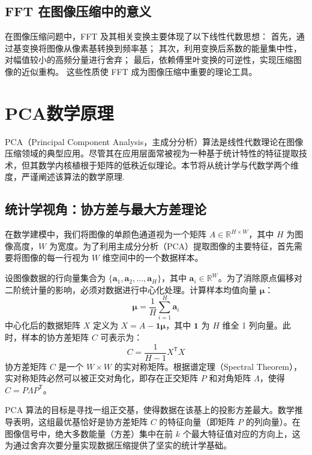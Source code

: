 \documentclass[12pt,a4paper]{article}
\begin{document}
\subsection{FFT 在图像压缩中的意义}

在图像压缩问题中，FFT 及其相关变换主要体现了以下线性代数思想：
首先，通过基变换将图像从像素基转换到频率基；
其次，利用变换后系数的能量集中性，对幅值较小的高频分量进行舍弃；
最后，依赖傅里叶变换的可逆性，实现压缩图像的近似重构。
这些性质使 FFT 成为图像压缩中重要的理论工具。

\section{PCA数学原理}
PCA（Principal Component Analysis，主成分分析）算法是线性代数理论在图像压缩领域的典型应用。尽管其在应用层面常被视为一种基于统计特性的特征提取技术，但其数学内核植根于矩阵的低秩近似理论。本节将从统计学与代数学两个维度，严谨阐述该算法的数学原理.

\subsection{统计学视角：协方差与最大方差理论}
在数学建模中，我们将图像的单颜色通道视为一个矩阵 $A \in \mathbb{R}^{H \times W}$，其中 $H$ 为图像高度，$W$ 为宽度。为了利用主成分分析（PCA）提取图像的主要特征，首先需要将图像的每一行视为 $W$ 维空间中的一个数据样本。

设图像数据的行向量集合为 $\{\mathbf{a}_1, \mathbf{a}_2, \dots, \mathbf{a}_H\}$，其中 $\mathbf{a}_i \in \mathbb{R}^W$。为了消除原点偏移对二阶统计量的影响，必须对数据进行中心化处理。计算样本均值向量 $\mathbf{\mu}$：
\begin{equation}
    \mathbf{\mu} = \frac{1}{H}\sum_{i=1}^H \mathbf{a}_i
\end{equation}
中心化后的数据矩阵 $X$ 定义为 $X = A - \mathbf{1}\mathbf{\mu}$，其中 $\mathbf{1}$ 为 $H$ 维全 1 列向量。此时，样本的协方差矩阵 $C$ 可表示为：
\begin{equation}
    C = \frac{1}{H-1} X^\mathsf{T} X
\end{equation}
协方差矩阵 $C$ 是一个 $W \times W$ 的实对称矩阵。根据谱定理（Spectral Theorem），实对称矩阵必然可以被正交对角化，即存在正交矩阵 $P$ 和对角矩阵 $\Lambda$，使得 $C = P \Lambda P^\mathsf{T}$。

PCA 算法的目标是寻找一组正交基，使得数据在该基上的投影方差最大。数学推导表明，这组最优基恰好是协方差矩阵 $C$ 的特征向量（即矩阵 $P$ 的列向量）。在图像信号中，绝大多数能量（方差）集中在前 $k$ 个最大特征值对应的方向上，这为通过舍弃次要分量实现数据压缩提供了坚实的统计学基础。
\end{document}
